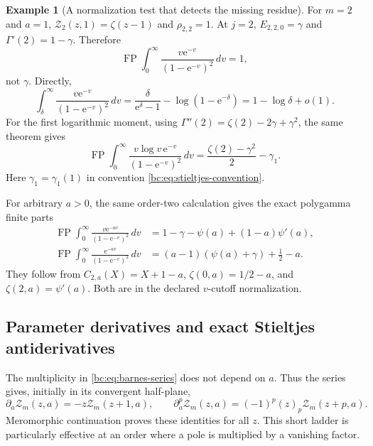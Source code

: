 \documentclass[11pt,letterpaper]{article}
\numberwithin{equation}{section}
\theoremstyle{definition}
\newtheorem{example}[theorem]{Example}
\theoremstyle{remark}
\newcommand{\bcFP}{\operatorname{FP}}
\newcommand{\bcZ}{\mathcal Z}
\newcommand{\bce}{\mathrm e}
\begin{document}
\begin{example}[A normalization test that detects the missing residue]
For $m=2$ and $a=1$,
$\bcZ_2(z,1)=\zeta(z-1)$ and $\rho_{2,2}=1$. At $j=2$,
$E_{2,2,0}=\gamma$ and $\Gamma'(2)=1-\gamma$. Therefore
\begin{equation}\label{bc:eq:Mellin-test-zero}
 \bcFP\int_0^\infty
           \frac{v\bce^{-v}}{(1-\bce^{-v})^2}\,dv=1,
\end{equation}
not $\gamma$. Directly,
\[
 \int_\delta^\infty\frac{v\bce^{-v}}{(1-\bce^{-v})^2}\,dv
  =\frac{\delta}{\bce^\delta-1}-\log(1-\bce^{-\delta})
  =1-\log\delta+o(1).
\]
For the first logarithmic moment, using
$\Gamma''(2)=\zeta(2)-2\gamma+\gamma^2$, the same theorem gives
\begin{equation}\label{bc:eq:Mellin-test-one}
 \bcFP\int_0^\infty
         \frac{v\log v\,\bce^{-v}}{(1-\bce^{-v})^2}\,dv
       =\frac{\zeta(2)-\gamma^2}{2}-\gamma_1.
\end{equation}
Here $\gamma_1=\gamma_1(1)$ in convention
\eqref{bc:eq:stieltjes-convention}.
\end{example}

For arbitrary $a>0$, the same order-two calculation gives the exact
polygamma finite parts
\begin{align}
 \bcFP\int_0^\infty\frac{v\bce^{-av}}{(1-\bce^{-v})^2}\,dv
   &=1-\gamma-\psi(a)+(1-a)\psi'(a),
       \label{bc:eq:fp-polygamma-two}\\
 \bcFP\int_0^\infty\frac{\bce^{-av}}{(1-\bce^{-v})^2}\,dv
   &=(a-1)(\psi(a)+\gamma)+\frac12-a.
       \label{bc:eq:fp-polygamma-one}
\end{align}
They follow from $C_{2,a}(X)=X+1-a$,
$\zeta(0,a)=1/2-a$, and $\zeta(2,a)=\psi'(a)$.
Both are in the declared $v$-cutoff normalization.

\subsection{Parameter derivatives and exact Stieltjes antiderivatives}

The multiplicity in \eqref{bc:eq:barnes-series} does not depend on $a$.
Thus the series gives, initially in its convergent half-plane,
\begin{equation}\label{bc:eq:a-ladder}
 \partial_a\bcZ_m(z,a)=-z\bcZ_m(z+1,a),\qquad
 \partial_a^p\bcZ_m(z,a)=(-1)^p(z)_p\bcZ_m(z+p,a).
\end{equation}
Meromorphic continuation proves these identities for all $z$. This
short ladder is particularly effective at an order where a pole is
multiplied by a vanishing factor.
\end{document}
